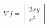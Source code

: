\documentclass[preview]{standalone}
\begin{document}
\begin{align*}
\nabla f = \begin{bmatrix} 2xy \\ x^2 \end{bmatrix}
\end{align*}
\end{document}
